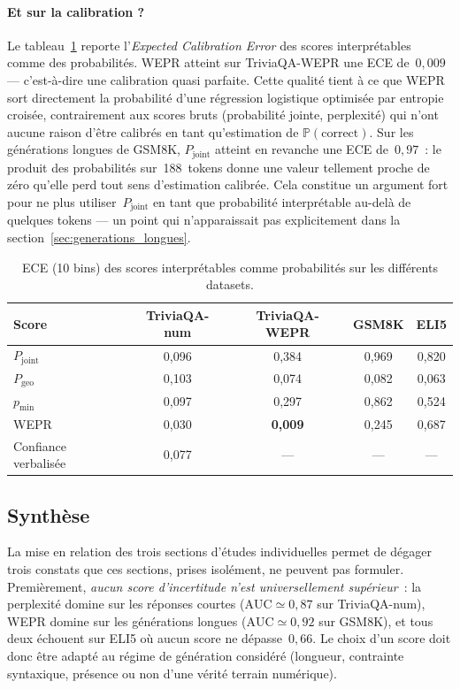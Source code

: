 \paragraph{Et sur la calibration ?}
Le tableau~\ref{tab:cross_ece} reporte l'\emph{Expected Calibration Error}
des scores interprétables comme des probabilités. WEPR atteint sur
TriviaQA-WEPR une ECE de~$0{,}009$ — c'est-à-dire une calibration
quasi parfaite. Cette qualité tient à ce que WEPR sort directement la
probabilité d'une régression logistique optimisée par entropie croisée,
contrairement aux scores bruts (probabilité jointe, perplexité) qui
n'ont aucune raison d'être calibrés en tant qu'estimation de
$\mathbb{P}(\text{correct})$. Sur les générations longues de GSM8K,
$P_{\mathrm{joint}}$ atteint en revanche une ECE de~$0{,}97$~: le
produit des probabilités sur~188~tokens donne une valeur tellement
proche de zéro qu'elle perd tout sens d'estimation calibrée. Cela
constitue un argument fort pour ne plus utiliser~$P_{\mathrm{joint}}$
en tant que probabilité interprétable au-delà de quelques tokens — un
point qui n'apparaissait pas explicitement dans la
section~\ref{sec:generations_longues}.

\begin{table}[H]
\centering
\caption{ECE (10 bins) des scores interprétables comme probabilités sur les
différents datasets.}
\label{tab:cross_ece}
\begin{tabular}{lcccc}
\toprule
Score & TriviaQA-num & TriviaQA-WEPR & GSM8K & ELI5 \\
\midrule
$P_{\mathrm{joint}}$  & 0{,}096 & 0{,}384 & 0{,}969 & 0{,}820 \\
$P_{\mathrm{geo}}$    & 0{,}103 & 0{,}074 & 0{,}082 & 0{,}063 \\
$p_{\min}$            & 0{,}097 & 0{,}297 & 0{,}862 & 0{,}524 \\
WEPR                  & 0{,}030 & \textbf{0{,}009} & 0{,}245 & 0{,}687 \\
Confiance verbalisée  & 0{,}077 & ---     & ---     & ---     \\
\bottomrule
\end{tabular}
\end{table}

\subsection{Synthèse}
\label{sec:transverse_synthese}

La mise en relation des trois sections d'études individuelles permet de
dégager trois constats que ces sections, prises isolément, ne peuvent
pas formuler. Premièrement, \emph{aucun score d'incertitude n'est
universellement supérieur}~: la perplexité domine sur les réponses
courtes ($\mathrm{AUC} \simeq 0{,}87$ sur TriviaQA-num), WEPR domine
sur les générations longues ($\mathrm{AUC} \simeq 0{,}92$ sur GSM8K),
et tous deux échouent sur ELI5 où aucun score ne dépasse~$0{,}66$.
Le choix d'un score doit donc être adapté au régime de génération
considéré (longueur, contrainte syntaxique, présence ou non d'une
vérité terrain numérique).

